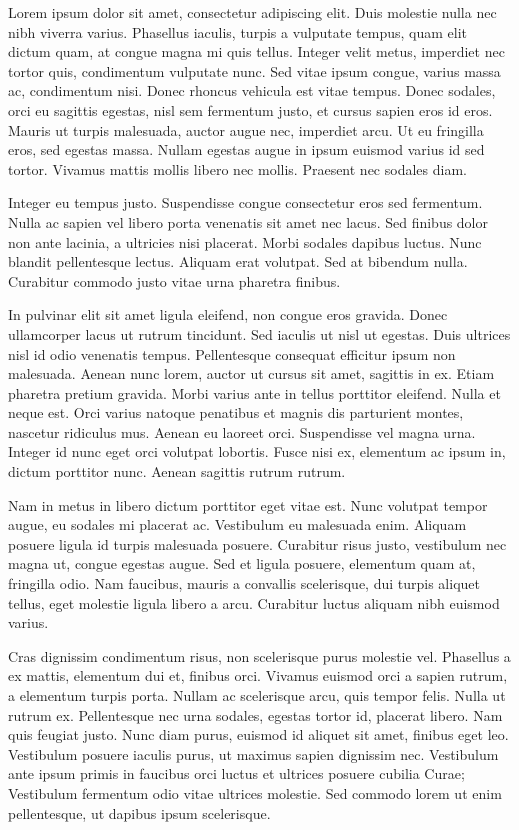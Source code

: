 \documentclass[12pt, letterpaper]{article}
\begin{document}
Lorem ipsum dolor sit amet, consectetur adipiscing elit. Duis molestie nulla nec nibh viverra varius. Phasellus iaculis, turpis a vulputate tempus, quam elit dictum quam, at congue magna mi quis tellus. Integer velit metus, imperdiet nec tortor quis, condimentum vulputate nunc. Sed vitae ipsum congue, varius massa ac, condimentum nisi. Donec rhoncus vehicula est vitae tempus. Donec sodales, orci eu sagittis egestas, nisl sem fermentum justo, et cursus sapien eros id eros. Mauris ut turpis malesuada, auctor augue nec, imperdiet arcu. Ut eu fringilla eros, sed egestas massa. Nullam egestas augue in ipsum euismod varius id sed tortor. Vivamus mattis mollis libero nec mollis. Praesent nec sodales diam.

Integer eu tempus justo. Suspendisse congue consectetur eros sed fermentum. Nulla ac sapien vel libero porta venenatis sit amet nec lacus. Sed finibus dolor non ante lacinia, a ultricies nisi placerat. Morbi sodales dapibus luctus. Nunc blandit pellentesque lectus. Aliquam erat volutpat. Sed at bibendum nulla. Curabitur commodo justo vitae urna pharetra finibus.

In pulvinar elit sit amet ligula eleifend, non congue eros gravida. Donec ullamcorper lacus ut rutrum tincidunt. Sed iaculis ut nisl ut egestas. Duis ultrices nisl id odio venenatis tempus. Pellentesque consequat efficitur ipsum non malesuada. Aenean nunc lorem, auctor ut cursus sit amet, sagittis in ex. Etiam pharetra pretium gravida. Morbi varius ante in tellus porttitor eleifend. Nulla et neque est. Orci varius natoque penatibus et magnis dis parturient montes, nascetur ridiculus mus. Aenean eu laoreet orci. Suspendisse vel magna urna. Integer id nunc eget orci volutpat lobortis. Fusce nisi ex, elementum ac ipsum in, dictum porttitor nunc. Aenean sagittis rutrum rutrum.

Nam in metus in libero dictum porttitor eget vitae est. Nunc volutpat tempor augue, eu sodales mi placerat ac. Vestibulum eu malesuada enim. Aliquam posuere ligula id turpis malesuada posuere. Curabitur risus justo, vestibulum nec magna ut, congue egestas augue. Sed et ligula posuere, elementum quam at, fringilla odio. Nam faucibus, mauris a convallis scelerisque, dui turpis aliquet tellus, eget molestie ligula libero a arcu. Curabitur luctus aliquam nibh euismod varius.

Cras dignissim condimentum risus, non scelerisque purus molestie vel. Phasellus a ex mattis, elementum dui et, finibus orci. Vivamus euismod orci a sapien rutrum, a elementum turpis porta. Nullam ac scelerisque arcu, quis tempor felis. Nulla ut rutrum ex. Pellentesque nec urna sodales, egestas tortor id, placerat libero. Nam quis feugiat justo. Nunc diam purus, euismod id aliquet sit amet, finibus eget leo. Vestibulum posuere iaculis purus, ut maximus sapien dignissim nec. Vestibulum ante ipsum primis in faucibus orci luctus et ultrices posuere cubilia Curae; Vestibulum fermentum odio vitae ultrices molestie. Sed commodo lorem ut enim pellentesque, ut dapibus ipsum scelerisque. 
\end{document}
